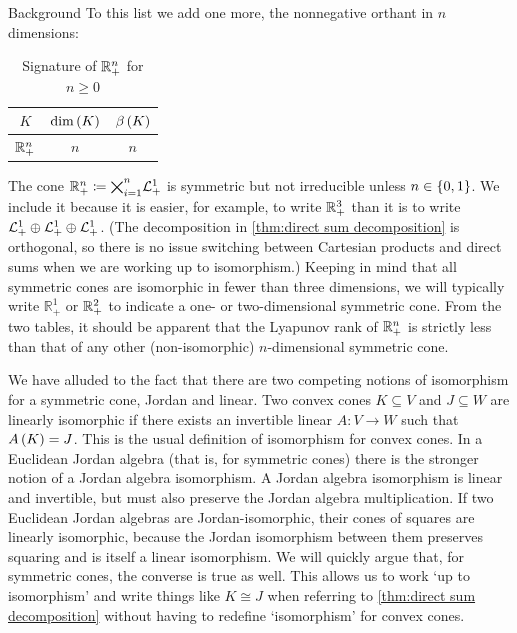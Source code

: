 \documentclass{interact}
\theoremstyle{plain}
\theoremstyle{definition}
\theoremstyle{remark}
\newcommand*{\Roneplus}[0]{ \mathbb{R}^{1}_{+} }
\begin{document}
\begin{section}{Background}
    To this list we add one more, the nonnegative orthant in $n$
    dimensions:

    \begin{table}[H]
      \begin{center}
        \begin{tabular}{c cc}
          $K$ & $\dim\of{K}$ & $\lyapunovrank{K}$\\
          \midrule
          $\Rnplus$ & $n$ & $n$
        \end{tabular}
        \caption{Signature of $\Rnplus$ for $n \ge 0$}\label{tab:rnplus signature}
      \end{center}
    \end{table}

    The cone $\Rnplus \coloneqq \cartprodmany{i=1}{n}{\Lnplus[1]}$ is
    symmetric but not irreducible unless $n \in \set{0,1}$. We include
    it because it is easier, for example, to write $\Rnplus[3]$ than
    it is to write $\Lnplus[1] \oplus \Lnplus[1] \oplus
    \Lnplus[1]$. (The decomposition in \cref{thm:direct sum
      decomposition} is orthogonal, so there is no issue switching
    between Cartesian products and direct sums when we are working up
    to isomorphism.) Keeping in mind that all symmetric cones are
    isomorphic in fewer than three dimensions, we will typically write
    $\Roneplus$ or $\Rnplus[2]$ to indicate a one- or two-dimensional
    symmetric cone. From the two tables, it should be apparent that
    the Lyapunov rank of $\Rnplus$ is strictly less than that of any
    other (non-isomorphic) $n$-dimensional symmetric cone.

    We have alluded to the fact that there are two competing notions
    of isomorphism for a symmetric cone, Jordan and linear. Two convex
    cones $K \subseteq V$ and $J \subseteq W$ are linearly isomorphic
    if there exists an invertible linear $A : V \to W$ such that
    $A\of{K} = J$. This is the usual definition of isomorphism for
    convex cones. In a Euclidean Jordan algebra (that is, for
    symmetric cones) there is the stronger notion of a Jordan algebra
    isomorphism. A Jordan algebra isomorphism is linear and
    invertible, but must also preserve the Jordan algebra
    multiplication. If two Euclidean Jordan algebras are
    Jordan-isomorphic, their cones of squares are linearly isomorphic,
    because the Jordan isomorphism between them preserves squaring and
    is itself a linear isomorphism. We will quickly argue that, for
    symmetric cones, the converse is true as well. This allows us to
    work `up to isomorphism' and write things like $K \cong J$ when
    referring to \cref{thm:direct sum decomposition} without having to
    redefine `isomorphism' for convex cones.


\end{section}
\end{document}
